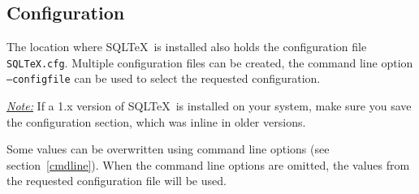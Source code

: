 \documentclass{article}
\newcommand{\vs}{\vspace{3mm}}
\begin{document}
\subsection{Configuration}\label{config}

The location where SQL\TeX\ is installed also holds the configuration file \texttt{SQLTeX.cfg}.
Multiple configuration files can be created, the command line option \texttt{--configfile} can be used to
select the requested configuration.

\vs

\noindent\hspace{-3mm}\textit{\underline{Note:}} If a 1.x version of SQL\TeX\ is installed on your system,
make sure you save the configuration section, which was inline in older versions.

\vs

Some values can be overwritten using command line options (see section~\ref{cmdline}). When the command line options are omitted, the values from the requested configuration file will be used.
\end{document}
